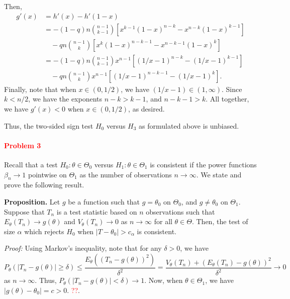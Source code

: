 \documentclass[10pt]{article}
\begin{document}
    Then, \begin{align*}
        g'(x) &= h'(x) - h'(1 - x) \\
            &= -(1 - q)n \binom{n - 1}{k - 1} \left[
                x^{k - 1} (1 - x)^{n - k} - x^{n - k} (1 - x)^{k - 1}
            \right] \\
            &\quad -qn \binom{n - 1}{k} \left[
                x^k (1 - x)^{n - k - 1} - x^{n - k - 1} (1 - x)^k
            \right] \\
            &= -(1 - q)n \binom{n - 1}{k - 1} x^{n - 1} \left[
                (1/x - 1)^{n - k} - (1/x - 1)^{k - 1}
            \right] \\
            &\quad -qn \binom{n - 1}{k} x^{n - 1} \left[
                (1/x - 1)^{n - k - 1} - (1/x - 1)^k
            \right].
    \end{align*}
    Finally, note that when $x \in (0, 1/2)$, we have $(1/x - 1) \in (1,
    \infty)$. Since $k < n / 2$, we have the exponents $n - k > k - 1$, and $n
    - k - 1 > k$. All together, we have $g'(x) < 0$ when $x \in (0, 1/2)$, as
    desired.

    Thus, the two-sided sign test $H_0$ versus $H_3$ as formulated above is
    unbiased.



    \paragraph{\textcolor{red}{Problem 3}} Recall that a test $H_0: \theta \in
    \Theta_0$ versus $H_1: \theta \in \Theta_1$ is consistent if the power
    functions $\beta_n \to 1$ pointwise on $\Theta_1$ as the number of
    observations $n \to \infty$. We state and prove the following result.

    \textbf{Proposition.} Let $g$ be a function such that $g = \theta_0$ on
    $\Theta_0$, and $g \neq \theta_0$ on $\Theta_1$. Suppose that $T_n$ is a
    test statistic based on $n$ observations such that $E_\theta(T_n) \to
    g(\theta)$ and $V_\theta(T_n) \to 0$ as $n \to \infty$ for all $\theta \in
    \Theta$. Then, the test of size $\alpha$ which rejects $H_0$ when $|T -
    \theta_0| > c_\alpha$ is consistent.

    \textit{Proof:} Using Markov's inequality, note that for any $\delta > 0$,
    we have \[
        P_\theta(|T_n - g(\theta)| \geq \delta)
        \leq \frac{E_\theta((T_n - g(\theta))^2)}{\delta^2}
        = \frac{V_\theta(T_n) + (E_\theta(T_n) - g(\theta))^2}{\delta^2} \to
        0
    \] as $n \to \infty$. Thus, $P_\theta(|T_n - g(\theta)| < \delta) \to 1$.
    Now, when $\theta \in \Theta_1$, we have $|g(\theta) - \theta_0| = c > 0$.
    \textcolor{red}{??}.
\end{document}
